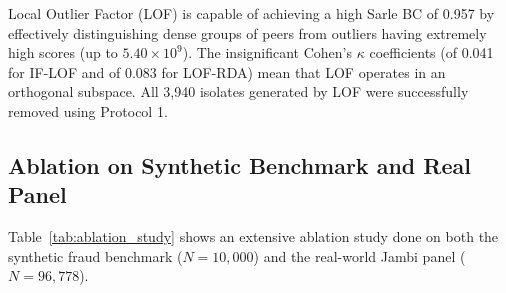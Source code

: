 \documentclass[conference]{IEEEtran}
\begin{document}
\begin{table}[htbp]
\centering
\caption{Score Distribution Bimodality and Subspace Overlap Matrix}
\label{tab:bimodality_overlap}
\setlength{\tabcolsep}{2.5pt}
\renewcommand{\arraystretch}{0.94}
\end{table}

Local Outlier Factor (LOF) is capable of achieving a high Sarle BC of 0.957 by effectively distinguishing dense groups of peers from outliers having extremely high scores (up to $5.40 \times 10^9$). The insignificant Cohen's $\kappa$ coefficients (of 0.041 for IF-LOF and of 0.083 for LOF-RDA) mean that LOF operates in an orthogonal subspace. All 3,940 isolates generated by LOF were successfully removed using Protocol 1.



\subsection{Ablation on Synthetic Benchmark and Real Panel}

Table~\ref{tab:ablation_study} shows an extensive ablation study done on both the synthetic fraud benchmark ($N = 10{,}000$) and the real-world Jambi panel ($N = 96{,}778$).
\end{document}
